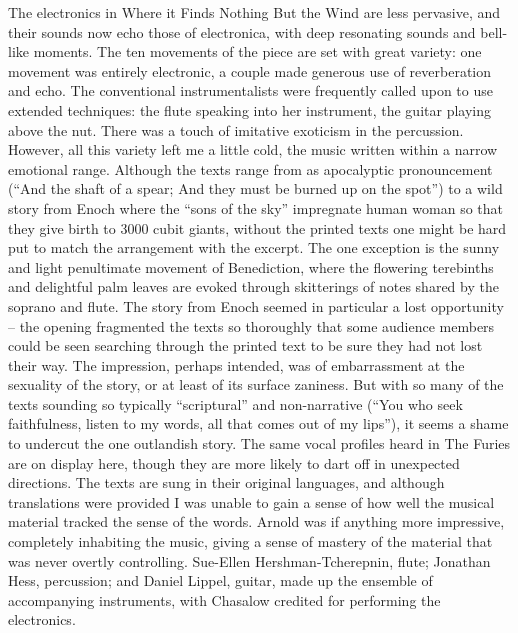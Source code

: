 The electronics in Where it Finds Nothing But the Wind are less pervasive, and their sounds now echo those of electronica, with deep resonating sounds and bell-like moments. The ten movements of the piece are set with great variety: one movement was entirely electronic, a couple made generous use of reverberation and echo. The conventional instrumentalists were frequently called upon to use extended techniques: the flute speaking into her instrument, the guitar playing above the nut. There was a touch of imitative exoticism in the percussion. However, all this variety left me a little cold, the music written within a narrow emotional range. Although the texts range from as apocalyptic pronouncement (“And the shaft of a spear; And they must be burned up on the spot”) to a wild story from Enoch where the “sons of the sky” impregnate human woman so that they give birth to 3000 cubit giants, without the printed texts one might be hard put to match the arrangement with the excerpt. The one exception is the sunny and light penultimate movement of Benediction, where the flowering terebinths and delightful palm leaves are evoked through skitterings of notes shared by the soprano and flute. The story from Enoch seemed in particular a lost opportunity – the opening fragmented the texts so thoroughly that some audience members could be seen searching through the printed text to be sure they had not lost their way. The impression, perhaps intended, was of embarrassment at the sexuality of the story, or at least of its surface zaniness. But with so many of the texts sounding so typically “scriptural” and non-narrative (“You who seek faithfulness, listen to my words, all that comes out of my lips”), it seems a shame to undercut the one outlandish story. The same vocal profiles heard in The Furies are on display here, though they are more likely to dart off in unexpected directions. The texts are sung in their original languages, and although translations were provided I was unable to gain a sense of how well the musical material tracked the sense of the words. Arnold was if anything more impressive, completely inhabiting the music, giving a sense of mastery of the material that was never overtly controlling. Sue-Ellen Hershman-Tcherepnin, flute; Jonathan Hess, percussion; and Daniel Lippel, guitar, made up the ensemble of accompanying instruments, with Chasalow credited for performing the electronics.

